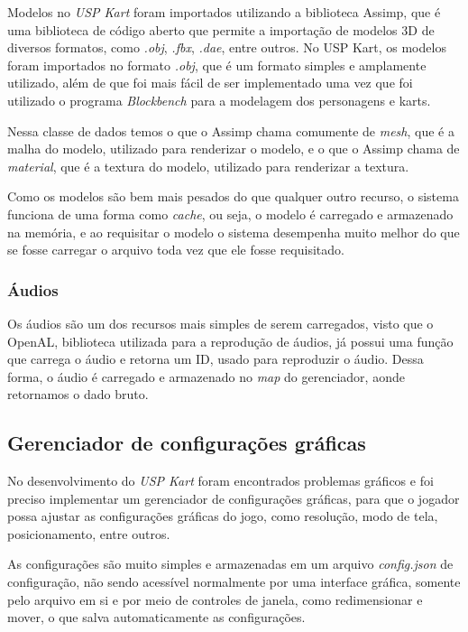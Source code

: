 Modelos no \textit{USP Kart} foram importados utilizando a biblioteca Assimp, que é uma biblioteca de código aberto que permite a importação de modelos 3D de diversos formatos, como \textit{.obj}, \textit{.fbx}, \textit{.dae}, entre outros. No USP Kart, os modelos foram importados no formato \textit{.obj}, que é um formato simples e amplamente utilizado, além de que foi mais fácil de ser implementado uma vez que foi utilizado o programa \textit{Blockbench} para a modelagem dos personagens e karts.

Nessa classe de dados temos o que o Assimp chama comumente de \textit{mesh}, que é a malha do modelo, utilizado para renderizar o modelo, e o que o Assimp chama de \textit{material}, que é a textura do modelo, utilizado para renderizar a textura.

Como os modelos são bem mais pesados do que qualquer outro recurso, o sistema funciona de uma forma como \textit{cache}, ou seja, o modelo é carregado e armazenado na memória, e ao requisitar o modelo o sistema desempenha muito melhor do que se fosse carregar o arquivo toda vez que ele fosse requisitado.

\subsubsection{Áudios}

Os áudios são um dos recursos mais simples de serem carregados, visto que o OpenAL, biblioteca utilizada para a reprodução de áudios, já possui uma função que carrega o áudio e retorna um ID, usado para reproduzir o áudio. Dessa forma, o áudio é carregado e armazenado no \textit{map} do gerenciador, aonde retornamos o dado bruto.

\subsection{Gerenciador de configurações gráficas}\label{sec:gerenciador-de-configuracoes-graficas}

No desenvolvimento do \textit{USP Kart} foram encontrados problemas gráficos e foi preciso implementar um gerenciador de configurações gráficas, para que o jogador possa ajustar as configurações gráficas do jogo, como resolução, modo de tela, posicionamento, entre outros.

As configurações são muito simples e armazenadas em um arquivo \textit{config.json} de configuração, não sendo acessível normalmente por uma interface gráfica, somente pelo arquivo em si e por meio de controles de janela, como redimensionar e mover, o que salva automaticamente as configurações.

